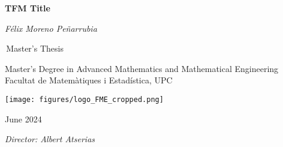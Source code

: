 \begin{titlepage}
    \begin{center}
        \vspace*{1cm}
            
        \Huge
        \textbf{TFM Title}
            
        \vspace{0.5cm}
        \Large
        \textit{Félix Moreno Peñarrubia}
            
        
            
        \,Master's Thesis
            
        \vspace{0.8cm}
            
       
            
        \Large
        Master's Degree in Advanced Mathematics and Mathematical Engineering \\
        Facultat de Matemàtiques i Estadística, UPC 
        \vspace{1.2cm}
        

          
        \texttt{[image: figures/logo\_FME\_cropped.png]}
 
        \vfill
        
      
        June 2024
        
		\vspace{2cm}
		\large        
        \textit{Director: Albert Atserias}
        
        
            
    \end{center}
\end{titlepage}
